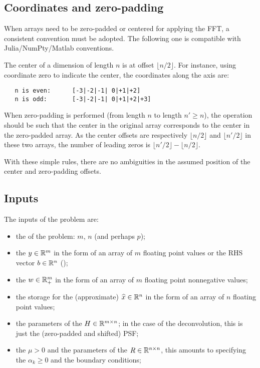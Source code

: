 \documentclass[9pt,a4paper,twocolumn]{article}
\begin{document}
\subsection{Coordinates and zero-padding}

When arrays need to be zero-padded or centered for applying the FFT, a
consistent convention must be adopted.  The following one is compatible with
Julia/NumPty/Matlab conventions.

The center of a dimension of length $n$ is at offset $\lfloor n/2 \rfloor$. 
For instance, using coordinate zero to indicate the center, the coordinates
along the axis are:
\begin{verbatim}
   n is even:      [-3|-2|-1| 0|+1|+2]
   n is odd:       [-3|-2|-1| 0|+1|+2|+3]
\end{verbatim}

When zero-padding is performed (\eg from length $n$ to length $n' \ge n$), the
operation should be such that the center in the original array corresponds to
the center in the zero-padded array.  As the center offsets are respectively
$\lfloor n/2 \rfloor$ and $\lfloor n'/2 \rfloor$ in these two arrays, the
number of leading zeros is $\lfloor n'/2 \rfloor - \lfloor n/2 \rfloor$.

With these simple rules, there are no ambiguities in the assumed position of
the center and zero-padding offsets.

\subsection{Inputs}

The inputs of the problem are:
\begin{itemize}
\item the  of the problem: $m$, $n$ (and perhaps $p$);

\item the  $y \in \mathbb{R}^{m}$ in the form of an array of $m$
floating point values or the RHS vector $b \in \mathbb{R}^{n}$ ();

\item the  $w \in \mathbb{R}^{m}_+$ in the form of an
array of $m$ floating point nonnegative values;

\item the storage for the (approximate)  $\widehat{x} \in
\mathbb{R}^{n}$ in the form of an array of $n$ floating point values;

\item the parameters of the  $H \in \mathbb{R}^{m \times
n}$; in the case of the deconvolution, this is just the (zero-padded and
shifted) PSF;

\item the  $\mu > 0$ and the parameters of
the  $R \in \mathbb{R}^{n \times n}$, this amounts
to specifying the $\alpha_k\ge 0$ and the boundary conditions;

\end{itemize}
\end{document}
